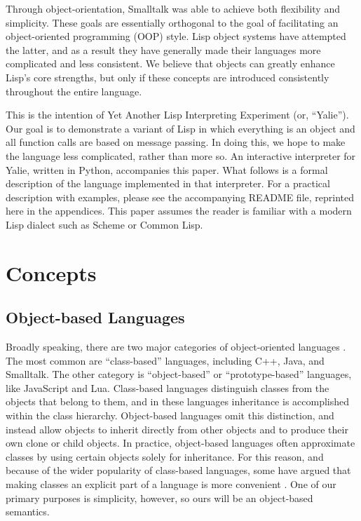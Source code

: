 \documentclass[twocolumn]{article}
\begin{document}
Through object-orientation, Smalltalk was able to achieve both
flexibility and simplicity. These goals are essentially orthogonal to
the goal of facilitating an object-oriented programming (OOP)
style. Lisp object systems have attempted the latter, and as a result
they have generally made their languages more complicated and less
consistent. We believe that objects can greatly enhance Lisp's core
strengths, but only if these concepts are introduced consistently
throughout the entire language.

This is the intention of Yet Another Lisp Interpreting Experiment (or,
``Yalie''). Our goal is to demonstrate a variant of Lisp in which
everything is an object and all function calls are based on message
passing. In doing this, we hope to make the language less complicated,
rather than more so. An interactive interpreter for Yalie, written in
Python, accompanies this paper. What follows is a formal description
of the language implemented in that interpreter. For a practical
description with examples, please see the accompanying README file,
reprinted here in the appendices. This paper assumes the reader is
familiar with a modern Lisp dialect such as Scheme or Common Lisp.

\section*{Concepts}
\subsection*{Object-based Languages}
Broadly speaking, there are two major categories of object-oriented
languages \cite{Abadi}. The most common are ``class-based'' languages,
including C++, Java, and Smalltalk. The other category is
``object-based'' or ``prototype-based'' languages, like JavaScript and
Lua. Class-based languages distinguish classes from the objects that
belong to them, and in these languages inheritance is accomplished
within the class hierarchy. Object-based languages omit this
distinction, and instead allow objects to inherit directly from other
objects and to produce their own clone or child objects. In practice,
object-based languages often approximate classes by using certain
objects solely for inheritance. For this reason, and because of the
wider popularity of class-based languages, some have argued that
making classes an explicit part of a language is more convenient
\cite{Bruce}. One of our primary purposes is simplicity, however, so
ours will be an object-based semantics.
\end{document}
